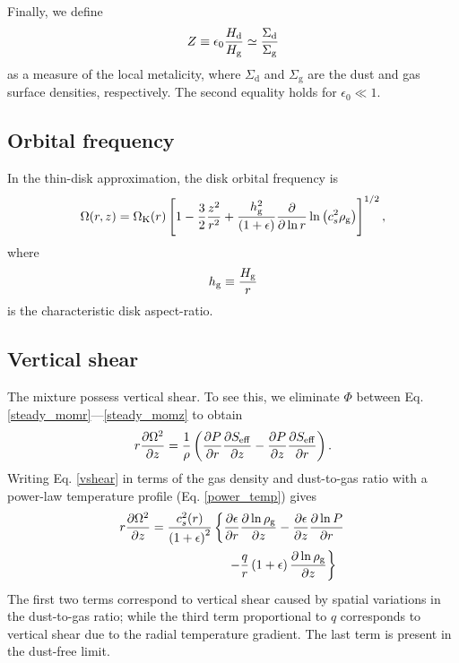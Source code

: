 Finally, we define 
\begin{align}
  Z \equiv \epsilon_0\frac{H_\mathrm{d}}{H_\mathrm{g}} \simeq
  \frac{\Sigma_\mathrm{d}}{\Sigma_\mathrm{g}} 
\end{align}
as a measure of the local metalicity, where $\Sigma_\mathrm{d}$ and
$\Sigma_\mathrm{g}$ are the dust and gas surface densities,
respectively. The second equality holds for $\epsilon_0\ll1$.  


\subsection{Orbital frequency} 
In the thin-disk approximation, the disk orbital frequency is 
\begin{align}
  \Omega(r,z) = \Omega_{\rm K}(r)\left[1 - \frac{3}{2}\frac{z^2}{r^2} +
    \frac{h_\mathrm{g}^2}{\left(1+\epsilon\right)}\frac{\partial}{\partial\ln{r}}\ln{\left(c_s^2\rho_\mathrm{g}\right)}
    \right]^{1/2}, 
\end{align}
where 
\begin{align}
  h_\mathrm{g} \equiv \frac{H_\mathrm{g}}{r}
\end{align}
is the characteristic disk aspect-ratio. 

\subsection{Vertical shear}\label{vertshear}
The mixture possess vertical shear. To see this, we eliminate $\Phi$
between Eq. \ref{steady_momr}---\ref{steady_momz} to 
obtain 
\begin{align}\label{vshear}
  r\frac{\partial \Omega^2}{\partial z} 
   = \frac{1}{\rho}\left(\frac{\partial P}{\partial r}\frac{\partial S_\mathrm{eff}}{\partial z} -\frac{\partial
    P}{\partial z}\frac{\partial S_\mathrm{eff}}{\partial r} \right). 
\end{align}
Writing Eq. \ref{vshear} in terms of the gas density and dust-to-gas
ratio with a power-law temperature profile (Eq. \ref{power_temp}) gives 
\begin{align}\label{vshear2}
  &r\frac{\p \Omega^2}{\p z}  =
  \frac{c_s^2(r)}{\left(1+\epsilon\right)^2}\left\{
  \frac{\p\epsilon}{\p r}\frac{\p\ln{\rhog}}{\p z}
 -\frac{\p\epsilon}{\p z}\frac{\p\ln{P}}{\p r}\right.\notag\\
  &\phantom{ r\frac{\p \Omega^2}{\p z}  =
    \frac{c_s^2(r)}{\left(1+\epsilon\right)^2}\left\{\right\} }
  \left. -\frac{q}{r} \left(1+\epsilon\right)\frac{\p\ln{\rhog}}{\p z} \right\} 
\end{align}
The first two terms correspond to vertical shear caused by spatial
variations in the dust-to-gas ratio; while the third term
proportional to $q$ corresponds to vertical shear due to the 
radial temperature gradient. The last term is present in the dust-free
limit. 

